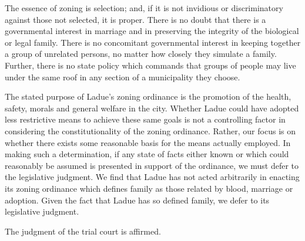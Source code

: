 The essence of zoning is selection; and, if it is not invidious or
discriminatory against those not selected, it is proper. There is no doubt that
there is a governmental interest in marriage and in preserving the integrity of
the biological or legal family. There is no concomitant governmental interest in
keeping together a group of unrelated persons, no matter how closely they
simulate a family. Further, there is no state policy which commands that groups
of people may live under the same roof in any section of a municipality they
choose.

The stated purpose of Ladue's zoning ordinance is the promotion of the health,
safety, morals and general welfare in the city. Whether Ladue could have adopted
less restrictive means to achieve these same goals is not a controlling factor
in considering the constitutionality of the zoning ordinance. Rather, our focus
is on whether there exists some reasonable basis for the means actually
employed. In making such a determination, if any state of facts either known or
which could reasonably be assumed is presented in support of the ordinance, we
must defer to the legislative judgment. We find that Ladue has not acted
arbitrarily in enacting its zoning ordinance which defines family as those
related by blood, marriage or adoption. Given the fact that Ladue has so defined
family, we defer to its legislative judgment.

The judgment of the trial court is affirmed.

